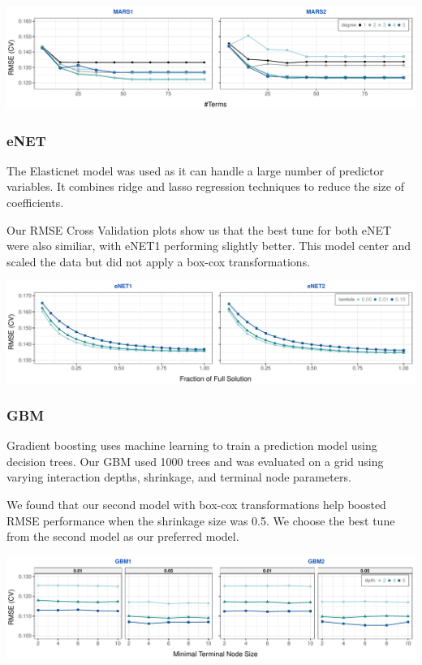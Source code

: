 \documentclass[]{report}
\begin{document}
\includegraphics{Proj2-JM_files/figure-latex/unnamed-chunk-8-1.pdf}

\hypertarget{enet}{%
\subsubsection{eNET}\label{enet}}

The Elasticnet model was used as it can handle a large number of
predictor variables. It combines ridge and lasso regression techniques
to reduce the size of coefficients.

Our RMSE Cross Validation plots show us that the best tune for both eNET
were also similiar, with eNET1 performing slightly better. This model
center and scaled the data but did not apply a box-cox transformations.

\includegraphics{Proj2-JM_files/figure-latex/unnamed-chunk-9-1.pdf}

\hypertarget{gbm}{%
\subsubsection{GBM}\label{gbm}}

Gradient boosting uses machine learning to train a prediction model
using decision trees. Our GBM used 1000 trees and was evaluated on a
grid using varying interaction depths, shrinkage, and terminal node
parameters.

We found that our second model with box-cox transformations help boosted
RMSE performance when the shrinkage size was 0.5. We choose the best
tune from the second model as our preferred model.

\includegraphics{Proj2-JM_files/figure-latex/unnamed-chunk-10-1.pdf}
\end{document}
